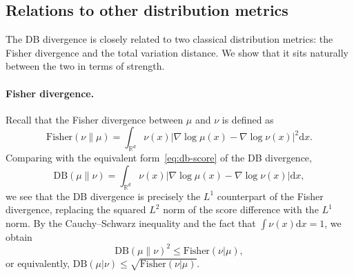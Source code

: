 \documentclass{article}
\newcommand{\Le}{\leqslant}
\newcommand{\D}{\mathrm{d}}
\newcommand{\DB}{\mathrm{DB}}
\newcommand{\Fish}{\mathrm{Fisher}}
\theoremstyle{plain}
\begin{document}
\subsection{Relations to other distribution metrics}

The DB divergence is closely related to two classical distribution metrics: the Fisher divergence and the total variation distance. We show that it sits naturally between the two in terms of strength.

\paragraph{Fisher divergence.}
Recall that the Fisher divergence between $\mu$ and $\nu$ is defined as
\begin{equation*}
    \Fish(\nu \| \mu) = \int_{\mathbb R^d} \nu(x) \bigl|\nabla \log \mu(x) - \nabla \log \nu(x) \bigr|^2 \D x.
\end{equation*}
Comparing with the equivalent form~\eqref{eq:db-score} of the DB divergence,
\begin{equation*}
    \DB(\mu \| \nu) = \int_{\mathbb R^d} \nu(x) \bigl|\nabla \log \mu(x) - \nabla \log \nu(x) \bigr| \D x,
\end{equation*}
we see that the DB divergence is precisely the $L^1$ counterpart of the Fisher divergence, replacing the squared $L^2$ norm of the score difference with the $L^1$ norm. By the Cauchy--Schwarz inequality and the fact that $\int \nu(x) \D x = 1$, we obtain
\begin{equation}\label{eq:db-fisher}
    \DB(\mu \| \nu)^2 \Le \Fish(\nu | \mu),
\end{equation}
or equivalently, $\DB(\mu | \nu) \Le \sqrt{\Fish(\nu | \mu)}$.
\end{document}
